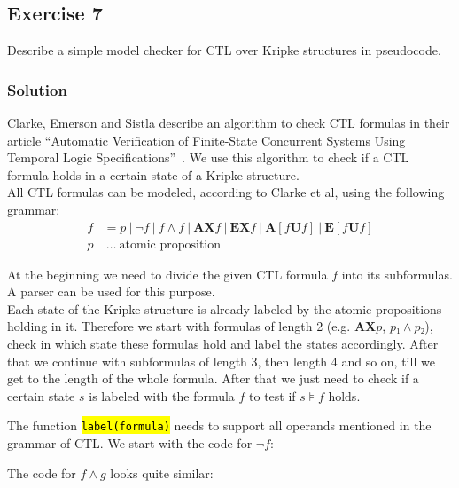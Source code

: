 \documentclass[a4paper, 12pt]{article}
\newcommand{\codeinput}[1]
{
    \begin{leftbar}
        {\fontsize{9pt}{11pt}}
    \end{leftbar}
}
\newcommand{\code}[1]
{
    \hl{\texttt{#1}}
}
\begin{document}
\subsection{Exercise 7}

Describe a simple model checker for CTL over Kripke structures in pseudocode.

\subsubsection{Solution}

Clarke, Emerson and Sistla describe an algorithm to check CTL formulas in
their article “Automatic Verification of Finite-State Concurrent Systems Using
Temporal Logic Specifications”~\cite{Clarke1986AutomaticVerification}. We use
this algorithm to check if a CTL formula holds in a certain state of a Kripke
structure.\\

All CTL formulas can be modeled, according to Clarke et al, using the following
grammar:
\begin{align*}
    f & = p ~|~ ¬f ~|~ f ∧ f ~|~
          \mathbf{AX} f ~|~ \mathbf{EX} f ~|~
          \mathbf{A}[f \mathbf{U} f] ~|~ \mathbf{E}[f \mathbf{U} f]\\
    p & ~…~ \text{atomic proposition}
\end{align*}

At the beginning we need to divide the given CTL formula $f$ into its
subformulas. A parser can be used for this purpose.\\

Each state of the Kripke structure is already labeled by the atomic
propositions holding in it. Therefore we start with formulas of length 2 (e.g.
$\mathbf{AX} p$, $p₁ ∧ p₂$), check in which state these formulas hold and
label the states accordingly. After that we continue with subformulas of
length 3, then length 4 and so on, till we get to the length of the whole
formula. After that we just need to check if a certain state $s$ is labeled
with the formula $f$ to test if $s⊧f$ holds.

\codeinput{model_check}

The function \code{label(formula)} needs to support all operands mentioned in
the grammar of CTL. We start with the code for $¬f$:

\codeinput{label_not}

The code for $f ∧ g$ looks quite similar:

\codeinput{label_or}
\end{document}
